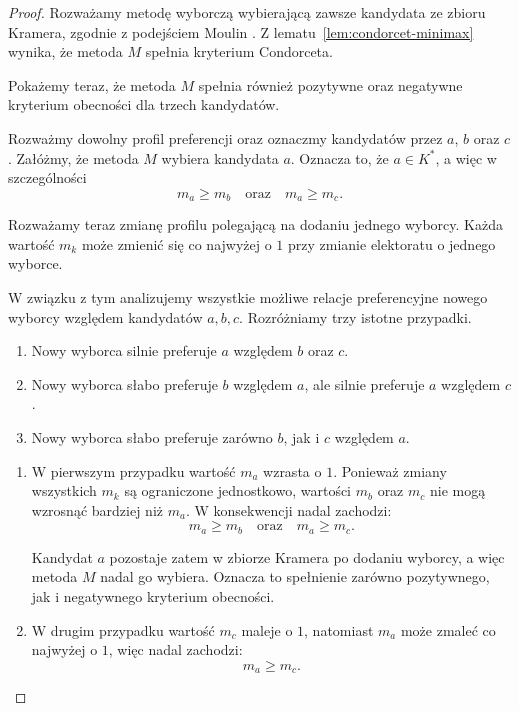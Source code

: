 \documentclass[12pt,a4paper]{mwrep}
\begin{document}
	\begin{proof}
		Rozważamy metodę wyborczą wybierającą zawsze kandydata ze zbioru Kramera, zgodnie z podejściem Moulin \cite{moulin1988}. Z lematu~\ref{lem:condorcet-minimax} wynika, że metoda \(M\) spełnia kryterium Condorceta.
		
		Pokażemy teraz, że metoda \(M\) spełnia również pozytywne oraz negatywne kryterium obecności dla trzech kandydatów.
		
		Rozważmy dowolny profil preferencji oraz oznaczmy kandydatów przez \(a\), \(b\) oraz \(c\). Załóżmy, że metoda \(M\) wybiera kandydata \(a\). Oznacza to, że \(a \in K^\ast\), a więc w szczególności
		\[
		m_a \geq m_b \quad \text{oraz} \quad m_a \geq m_c.
		\]
		
		Rozważamy teraz zmianę profilu polegającą na dodaniu jednego wyborcy. Każda wartość \(m_k\) może zmienić się co najwyżej o \(1\) przy zmianie elektoratu o jednego wyborce.
		
		W związku z tym analizujemy wszystkie możliwe relacje preferencyjne nowego wyborcy względem kandydatów \(a,b,c\). Rozróżniamy trzy istotne przypadki.
		
		\begin{enumerate}
			\item Nowy wyborca silnie preferuje \(a\) względem \(b\) oraz \(c\).
			
			\item Nowy wyborca słabo preferuje \(b\) względem \(a\), ale silnie preferuje \(a\) względem \(c\).
			
			\item Nowy wyborca słabo preferuje zarówno \(b\), jak i \(c\) względem \(a\).
		\end{enumerate}
	
		\begin{enumerate}[\text{Ad} 1.]
			\item W pierwszym przypadku wartość \(m_a\) wzrasta o \(1\). Ponieważ zmiany wszystkich \(m_k\) są ograniczone jednostkowo, wartości \(m_b\) oraz \(m_c\) nie mogą wzrosnąć bardziej niż \(m_a\). W konsekwencji nadal zachodzi:
			\[
			m_a \geq m_b \quad \text{oraz} \quad m_a \geq m_c.
			\]
			
			Kandydat \(a\) pozostaje zatem w zbiorze Kramera po dodaniu wyborcy, a więc metoda \(M\) nadal go wybiera. Oznacza to spełnienie zarówno pozytywnego, jak i negatywnego kryterium obecności.
			
			\item W drugim przypadku wartość \(m_c\) maleje o \(1\), natomiast \(m_a\) może zmaleć co najwyżej o \(1\), więc nadal zachodzi:
			\[
			m_a \geq m_c.
			\]
			

\end{enumerate}
\end{proof}
\end{document}
